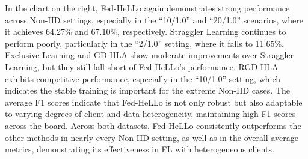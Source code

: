 \documentclass[lettersize,journal]{IEEEtran}
\begin{document}
In the chart on the right, Fed-HeLLo again demonstrates strong performance across Non-IID settings, especially in the ``10/1.0'' and ``20/1.0'' scenarios, where it achieves 64.27\% and 67.10\%, respectively. Straggler Learning continues to perform poorly, particularly in the ``2/1.0'' setting, where it falls to 11.65\%. Exclusive Learning and GD-HLA show moderate improvements over Straggler Learning, but they still fall short of Fed-HeLLo’s performance. {RGD-HLA exhibits competitive performance, especially in the ``10/1.0'' setting, which indicates the stable training is important for the extreme Non-IID cases.} The average F1 scores indicate that Fed-HeLLo is not only robust but also adaptable to varying degrees of client and data heterogeneity, maintaining high F1 scores across the board.
Across both datasets, Fed-HeLLo consistently outperforms the other methods in nearly every Non-IID setting, as well as in the overall average metrics, demonstrating its effectiveness in FL with heterogeneous clients.


\begin{table}[t]
  \centering
  \caption{Justification of FIM-HLA with different training strategies.}
  \label{tab:abl-fim-1}%
\end{table}%
\end{document}

